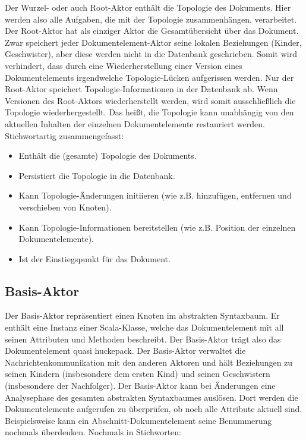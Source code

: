 Der Wurzel- oder auch Root-Aktor enthält die Topologie des Dokuments. Hier werden also alle Aufgaben, die mit der Topologie zusammenhängen, verarbeitet. Der Root-Aktor hat als einziger Aktor die Gesamtübersicht über das Dokument. Zwar speichert jeder Dokumentelement-Aktor seine lokalen Beziehungen (Kinder, Geschwister), aber diese werden nicht in die Datenbank geschrieben. Somit wird verhindert, dass durch eine Wiederherstellung einer Version eines Dokumentelements irgendwelche Topologie-Lücken aufgerissen werden. Nur der Root-Aktor speichert Topologie-Informationen in der Datenbank ab. Wenn Versionen des Root-Aktors wiederherstellt werden, wird somit ausschließlich die Topologie wiederhergestellt. Das heißt, die Topologie kann unabhängig von den aktuellen Inhalten der einzelnen Dokumentelemente restauriert werden. Stichwortartig zusammengefasst:

 
\begin{itemize}

\item Enthält die (gesamte) Topologie des Dokuments.
\item Persistiert die Topologie in die Datenbank.
\item Kann Topologie-Änderungen initiieren (wie z.B. hinzufügen, entfernen und verschieben von Knoten).
\item Kann Topologie-Informationen bereitstellen (wie z.B. Position der einzelnen Dokumentelemente).
\item Ist der Einstiegspunkt für das Dokument.
\end{itemize}
 
\subsection{Basis-Aktor}\label{}
 
Der Basis-Aktor repräsentiert einen Knoten im abstrakten Syntaxbaum. Er enthält eine Instanz einer Scala-Klasse, welche das Dokumentelement mit all seinen Attributen und Methoden beschreibt. Der Basis-Aktor trägt also das Dokumentelement quasi huckepack. Der Basis-Aktor verwaltet die Nachrichtenkommunikation mit den anderen Aktoren und hält Beziehungen zu seinen Kindern (insbesondere dem ersten Kind) und seinen Geschwistern (insbesondere der Nachfolger). Der Basis-Aktor kann bei Änderungen eine Analysephase des gesamten abstrakten Syntaxbaumes auslösen. Dort werden die Dokumentelemente aufgerufen zu überprüfen, ob noch alle Attribute aktuell sind. Beispielsweise kann ein Abschnitt-Dokumentelement seine Benummerung nochmals überdenken. Nochmals in Stichworten:

